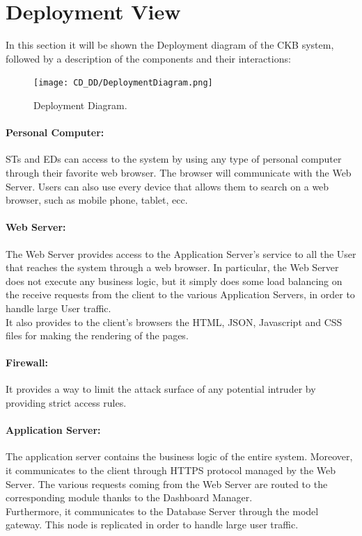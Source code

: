 \section{Deployment View}
\label{sec:deployment_view}%

In this section it will be shown the Deployment diagram of the CKB system, followed by a description of the components and their interactions:
\begin{figure}[H]
    \begin{center}
        \texttt{[image: CD\_DD/DeploymentDiagram.png]}
        \caption{Deployment Diagram.}
        \label{fig:Deployment_Diagram}%
    \end{center}
\end{figure}

\paragraph{Personal Computer:}
STs and EDs can access to the system by using any type of personal computer through their favorite web browser. The browser will communicate with the Web Server. Users can also use every device that allows them to search on a web browser, such as mobile phone, tablet, ecc.

\paragraph{Web Server:}
The Web Server provides access to the Application Server’s service to all the User that reaches the system through a web browser. In particular, the Web Server does not execute any business logic, but it simply does some load balancing on the receive requests from the client to the various Application Servers, in order to handle large User traffic.\\
It also provides to the client's browsers the HTML, JSON, Javascript and CSS files for making the rendering of the pages.

\paragraph{Firewall:}
It provides a way to limit the attack surface of any potential intruder by providing strict access rules.

\paragraph{Application Server:}
The application server contains the business logic of the entire system. Moreover, it communicates to the client through HTTPS protocol managed by the Web Server. The various requests coming from the Web Server are routed to the corresponding module thanks to the Dashboard Manager.\\
Furthermore, it communicates to the Database Server through the model gateway. This node is replicated in order to handle large user traffic.

